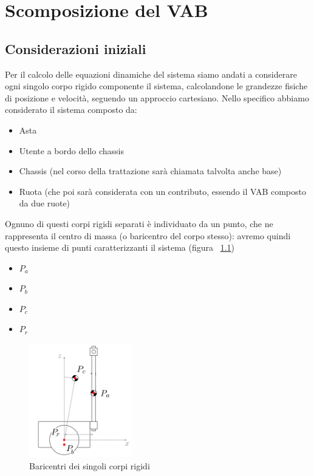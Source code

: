 \chapter{Scomposizione del VAB}
\section{Considerazioni iniziali}
Per il calcolo delle equazioni dinamiche del sistema siamo andati a considerare ogni singolo corpo rigido componente il sistema, calcolandone le grandezze fisiche di posizione e velocità, seguendo un approccio cartesiano. 
Nello specifico abbiamo considerato il sistema composto da:
\begin{itemize}
	\item Asta
	\item Utente a bordo dello chassis
	\item Chassis (nel corso della trattazione sarà chiamata talvolta anche base)
	\item Ruota (che poi sarà considerata con un contributo, essendo il VAB composto da due ruote)
\end{itemize}

Ognuno di questi corpi rigidi separati è individuato da un punto, che ne rappresenta il centro di massa (o baricentro del corpo stesso): avremo quindi questo insieme di punti caratterizzanti il sistema (figura ~\ref{fig:VAB_baricentri})

\begin{itemize}
	\item \textbf{$P_a$}
	\item \textbf{$P_b$}
	\item \textbf{$P_c$}
	\item \textbf{$P_r$}
\end{itemize}

\begin{figure}[H]
	\centering   	
	\includegraphics[width=0.4\textwidth]{Immagini/VAB_baricentrum.png}
	\caption{Baricentri dei singoli corpi rigidi}
	\label{fig:VAB_baricentri}
\end{figure} 

